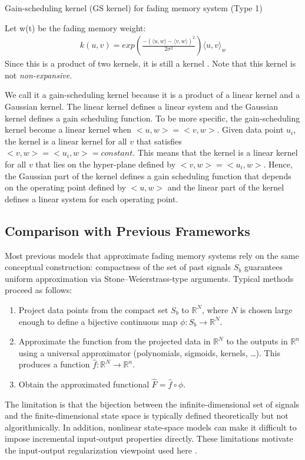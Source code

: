 \begin{definition}{Gain-scheduling kernel (GS kernel) for fading memory system (Type 1)}

Let w(t) be the fading memory weight:
\begin{eqnarray}
    k(u,v)=exp\left(\frac{-(\langle u,w\rangle-\langle v,w\rangle)^2}{2\sigma^2}\right)\langle u,v\rangle_w
\end{eqnarray}
Since this is a product of two kernels, it is still a kernel \cite{paulsen_introduction_2016}. Note that this kernel is not \emph{non-expansive}.
\end{definition}

We call it a gain-scheduling kernel because it is a product of a linear kernel and a Gaussian kernel. The linear kernel defines a linear system and the Gaussian kernel defines a gain scheduling function. To be more specific, the gain-scheduling kernel become a linear kernel when $<u,w>=<v,w>$. Given data point $u_i$, the kernel is a linear kernel for all $v$ that satisfies $<v,w>=<u_i,w>=constant$. This means that the kernel is a linear kernel for all $v$ that lies on the hyper-plane defined by $<v,w>=<u_i,w>$. Hence, the Gaussian part of the kernel defines a gain scheduling function that depends on the operating point defined by $<u,w>$ and the linear part of the kernel defines a linear system for each operating point.

\subsection{Comparison with Previous Frameworks}
Most previous models \autocite{boyd_fading_1985,maass_neural_2000,maass_computational_2004,grigoryeva_echo_2018} that approximate fading memory systems rely on the same conceptual construction: compactness of the set of past signals $S_b$ guarantees uniform approximation via Stone--Weierstrass-type arguments. Typical methods proceed as follows:
\begin{enumerate}
    \item Project data points from the compact set $S_b$ to $\mathbb{R}^N$, where $N$ is chosen large enough to define a bijective continuous map $\phi: S_b \to \mathbb{R}^N$.
    \item Approximate the function from the projected data in $\mathbb{R}^N$ to the outputs in $\mathbb{R}^{n}$ using a universal approximator (polynomials, sigmoids, kernels, \dots). This produces a function $\hat{f}: \mathbb{R}^N \to \mathbb{R}^n$.
    \item Obtain the approximated functional $\hat{F} = \hat{f} \circ \phi$.
\end{enumerate}
The limitation is that the bijection between the infinite-dimensional set of signals and the finite-dimensional state space is typically defined theoretically but not algorithmically. In addition, nonlinear state-space models can make it difficult to impose incremental input-output properties directly. These limitations motivate the input-output regularization viewpoint used here \autocite{sepulchre_incremental_2022}.


